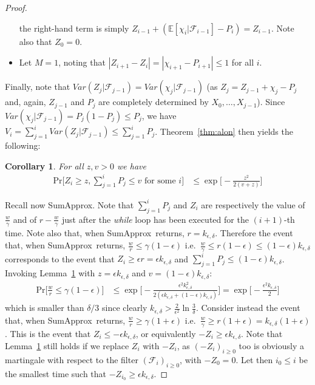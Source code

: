 \documentclass[a4paper,11pt]{article}
\newcommand{\E}{\mathbb{E}}
\newcommand{\prob}{\text{Pr}}
\newcommand{\sumest}{SumApprox}
\newcommand{\kerr}{k_{\epsilon,\delta}}
\newtheorem{corollary}{Corollary}
\begin{document}
\begin{proof}
\begin{itemize}
the right-hand term is simply $Z_{i-1} + (\E[\chi_i|\mathcal{F}_{i-1}]-P_i) = Z_{i-1}$. Note also that $Z_0 = 0$.
\item Let $M=1$, noting that $|Z_{i+1}-Z_i| = |\chi_{i+1} - P_{i+1}| \le 1$ for all $i$.
\end{itemize}
\vspace{5pt}
Finally, note that $Var(Z_j|\mathcal{F}_{j-1}) = Var(\chi_j|\mathcal{F}_{j-1})$ (as $Z_j = Z_{j-1} + \chi_j - P_j$ and, again, $Z_{j-1}$ and $P_j$ are completely determined by $X_0,\dots,X_{j-1}$).
Since $Var(\chi_j|\mathcal{F}_{j-1}) = P_j(1-P_j) \le P_j$, we have $V_i = \sum_{j=1}^i Var(Z_j|\mathcal{F}_{j-1}) \le \sum_{j=1}^i P_j$.
Theorem~\ref{thm:alon} then yields the following:
\begin{corollary}
\label{cor:martbound}
For all $z,v > 0$ we have
\begin{align}
\prob\big[Z_i \ge z, \sum_{j=1}^i P_j \le v \text{ for some } i\big] &\le 
\exp{\!\Big[\!-\frac{z^2}{2(v+z)}\Big]}
\end{align}
\end{corollary}
Recall now \sumest.
Note that  $\sum_{j=1}^i P_j$ and $Z_i$ are respectively the value of $\frac{w}{\gamma}$ and of $r-\frac{w}{\gamma}$ just after the \emph{while} loop has been executed for the $(i+1)$-th time.
Note also that, when \sumest\ returns, $r=\kerr$.
Therefore the event that, when \sumest\ returns, $\frac{w}{r} \le \gamma(1-\epsilon)$ i.e.\ $\frac{w}{\gamma} \le r (1-\epsilon) \le (1-\epsilon)\kerr$ corresponds to the event that $Z_i \ge \epsilon r = \epsilon \kerr$ and $\sum_{j=1}^i P_j \le (1-\epsilon)\kerr$.
Invoking Lemma~\ref{cor:martbound} with $z=\epsilon\kerr$ and $v=(1-\epsilon)\kerr$:
\begin{align}
\prob\big[\frac{w}{r} \le \gamma(1-\epsilon)\big]  &\le \exp{\!\Big[\!-\frac{\epsilon^2 k_{\epsilon,\delta}^2}{2(\epsilon k_{\epsilon,\delta} + (1-\epsilon)k_{\epsilon,\delta})}\Big]}
= \exp{\!\Big[\!-\frac{\epsilon^2 k_{\epsilon,\delta}}{2}\Big]}
\end{align}
which is smaller than $\delta/3$ since clearly $\kerr > \frac{2}{\epsilon^2}\ln{\frac{3}{\delta}}$.
Consider instead the event that, when \sumest\ returns, $\frac{w}{r} \ge \gamma(1+\epsilon)$ i.e.\ $\frac{w}{\gamma} \ge r (1+\epsilon) = \kerr(1+\epsilon)$.
This is the event that $Z_i \le -\epsilon\kerr$, or equivalently $-Z_i \ge \epsilon\kerr$.
Note that Lemma~\ref{cor:martbound} still holds if we replace $Z_i$ with $-Z_i$, as $(-Z_i)_{i \ge 0}$ too is obviously a martingale with respect to the filter $(\mathcal{F}_i)_{i\ge 0}$, with $-Z_0=0$. Let then $i_0 \le i$ be the smallest time such that $-Z_{i_0} \ge \epsilon k_{\epsilon,\delta}$.

\end{proof}
\end{document}
